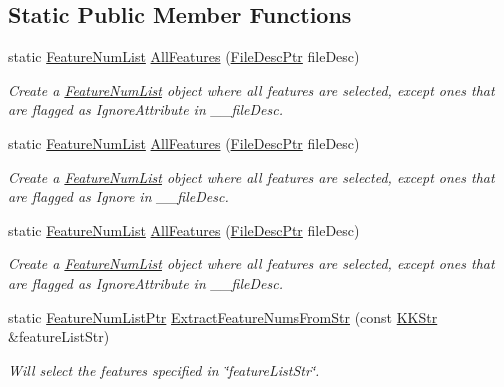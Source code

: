 \subsection*{Static Public Member Functions}
\begin{DoxyCompactItemize}
\item 
static \hyperlink{class_k_k_m_l_l_1_1_feature_num_list}{Feature\+Num\+List} \hyperlink{class_k_k_m_l_l_1_1_feature_num_list_ae5f9df4aba157bc549f0f2c12ceee6dc}{All\+Features} (\hyperlink{namespace_k_k_m_l_l_aa0d0b6ab4ec18868a399b8455b05d914}{File\+Desc\+Ptr} file\+Desc)
\begin{DoxyCompactList}\small\item\em Create a \hyperlink{class_k_k_m_l_l_1_1_feature_num_list}{Feature\+Num\+List} object where all features are selected, except ones that are flagged as Ignore\+Attribute in \textquotesingle{}\+\_\+\+\_\+file\+Desc\textquotesingle{}. \end{DoxyCompactList}\item 
static \hyperlink{class_k_k_m_l_l_1_1_feature_num_list}{Feature\+Num\+List} \hyperlink{class_k_k_m_l_l_1_1_feature_num_list_a90cdbdaaa9bff280cb23c6e3f4cec29d}{All\+Features} (\hyperlink{namespace_k_k_m_l_l_aa0d0b6ab4ec18868a399b8455b05d914}{File\+Desc\+Ptr} file\+Desc)
\begin{DoxyCompactList}\small\item\em Create a \hyperlink{class_k_k_m_l_l_1_1_feature_num_list}{Feature\+Num\+List} object where all features are selected, except ones that are flagged as Ignore in \textquotesingle{}\+\_\+\+\_\+file\+Desc\textquotesingle{}. \end{DoxyCompactList}\item 
static \hyperlink{class_k_k_m_l_l_1_1_feature_num_list}{Feature\+Num\+List} \hyperlink{class_k_k_m_l_l_1_1_feature_num_list_ae5f9df4aba157bc549f0f2c12ceee6dc}{All\+Features} (\hyperlink{namespace_k_k_m_l_l_aa0d0b6ab4ec18868a399b8455b05d914}{File\+Desc\+Ptr} file\+Desc)
\begin{DoxyCompactList}\small\item\em Create a \hyperlink{class_k_k_m_l_l_1_1_feature_num_list}{Feature\+Num\+List} object where all features are selected, except ones that are flagged as Ignore\+Attribute in \textquotesingle{}\+\_\+\+\_\+file\+Desc\textquotesingle{}. \end{DoxyCompactList}\item 
static \hyperlink{class_k_k_m_l_l_1_1_feature_num_list_a8c7e53951a6f552a3f5e45c599ef05be}{Feature\+Num\+List\+Ptr} \hyperlink{class_k_k_m_l_l_1_1_feature_num_list_a9e9f77b3707b7a1c5600f29c89349efd}{Extract\+Feature\+Nums\+From\+Str} (const \hyperlink{class_k_k_b_1_1_k_k_str}{K\+K\+Str} \&feature\+List\+Str)
\begin{DoxyCompactList}\small\item\em Will select the features specified in \char`\"{}feature\+List\+Str\char`\"{}. \end{DoxyCompactList}\end{DoxyCompactItemize}


